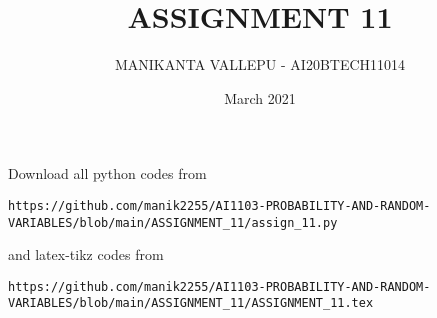 \documentclass[journal,12pt,twocolumn]{IEEEtran}
\date{March 2021}
\DeclareMathOperator*{\Res}{Res}
\begin{document}
\newcommand{\BEQA}{\begin{eqnarray}}
\newcommand{\EEQA}{\end{eqnarray}}
\newcommand{\define}{\stackrel{\triangle}{=}}

\raggedbottom
\setlength{\parindent}{0pt}
\providecommand{\mbf}{\mathbf}
\providecommand{\pr}[1]{\ensuremath{\Pr\left(#1\right)}}
\providecommand{\qfunc}[1]{\ensuremath{Q\left(#1\right)}}
\providecommand{\fn}[1]{\ensuremath{f\left(#1\right)}}
\providecommand{\e}[1]{\ensuremath{E\left(#1\right)}}
\providecommand{\sbrak}[1]{\ensuremath{{}\left[#1\right]}}
\providecommand{\lsbrak}[1]{\ensuremath{{}\left[#1\right.}}
\providecommand{\rsbrak}[1]{\ensuremath{{}\left.#1\right]}}
\providecommand{\brak}[1]{\ensuremath{\left(#1\right)}}
\providecommand{\lbrak}[1]{\ensuremath{\left(#1\right.}}
\providecommand{\rbrak}[1]{\ensuremath{\left.#1\right)}}
\providecommand{\cbrak}[1]{\ensuremath{\left\{#1\right\}}}
\providecommand{\lcbrak}[1]{\ensuremath{\left\{#1\right.}}
\providecommand{\rcbrak}[1]{\ensuremath{\left.#1\right\}}}
\theoremstyle{remark}
\newtheorem{rem}{Remark}
\newcommand{\sgn}{\mathop{\mathrm{sgn}}}
\providecommand{\abs}[1]{\vert#1\vert}
\providecommand{\res}[1]{\Res\displaylimits_{#1}} 
\providecommand{\norm}[1]{\lVert#1\rVert}
\providecommand{\mtx}[1]{\mathbf{#1}}
\providecommand{\mean}[1]{E[ #1 ]}
\providecommand{\fourier}{\overset{\mathcal{F}}{ \rightleftharpoons}}
\providecommand{\system}{\overset{\mathcal{H}}{ \longleftrightarrow}}
\newcommand{\solution}{\noindent \textbf{Solution: }}
\newcommand{\cosec}{\,\text{cosec}\,}
\providecommand{\dec}[2]{\ensuremath{\overset{#1}{\underset{#2}{\gtrless}}}}
\newcommand{\myvec}[1]{\ensuremath{\begin{pmatrix}#1\end{pmatrix}}}
\newcommand{\mydet}[1]{\ensuremath{\begin{vmatrix}#1\end{vmatrix}}}
\makeatletter
\vspace{3cm}
\title{ASSIGNMENT 11}
\author{MANIKANTA VALLEPU - AI20BTECH11014}
\maketitle
\newpage
\bigskip
\renewcommand{\thetable}{\theenumi}
Download all python codes from 
\begin{lstlisting}
https://github.com/manik2255/AI1103-PROBABILITY-AND-RANDOM-VARIABLES/blob/main/ASSIGNMENT_11/assign_11.py
\end{lstlisting}
%
and latex-tikz codes from 
%
\begin{lstlisting}
https://github.com/manik2255/AI1103-PROBABILITY-AND-RANDOM-VARIABLES/blob/main/ASSIGNMENT_11/ASSIGNMENT_11.tex
\end{lstlisting}
\end{document}
